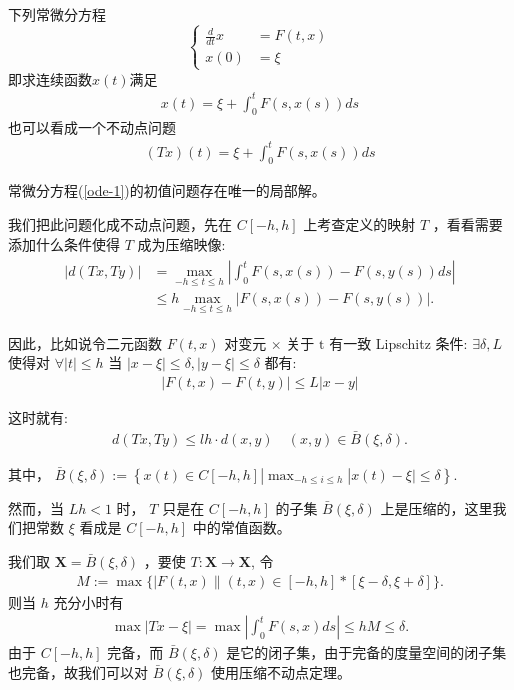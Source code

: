 下列常微分方程
\begin{equation}
    \left\lbrace\begin{array}{ll}
    \frac{d}{dt}x &= F(t, x)  \\
    x(0) &= \xi 
    \end{array}\right.\label{ode-1}
\end{equation}
即求连续函数$x(t)$满足
\begin{align*}
    x(t) = \xi + \int_{0}^t F(s, x(s)) ds
\end{align*}
也可以看成一个不动点问题
\begin{align*}
    (Tx)(t) = \xi + \int_0^t F(s, x(s))ds
\end{align*}
\begin{example}
    常微分方程(\ref{ode-1})的初值问题存在唯一的局部解。
    
    我们把此问题化成不动点问题，先在 $C[-h, h]$ 上考查定义的映射 $T$ ，看看需要添加什么条件使得 $T$ 成为压缩映像:
    \begin{align*}
        \begin{aligned}
            |d(T x, T y)| & =\max _{-h \leq t \leq h}\left|\int_0^t F(s, x(s))-F(s, y(s)) d s\right| \\
            & \leq h \max _{-h \leq t \leq h}|F(s, x(s))-F(s, y(s))| .
        \end{aligned}
    \end{align*}

    因此，比如说令二元函数 $F(t, x)$ 对变元 $\times$ 关于 $\mathrm{t}$ 有一致 Lipschitz 条件: $\exists \delta, L$ 使得对 $\forall|t| \leq h$ 当 $|x-\xi| \leq \delta,|y-\xi| \leq \delta$ 都有:
    \begin{align}
        |F(t, x)-F(t, y)| \leq L|x-y|\label{lipschitz}
    \end{align}

    这时就有:
    \begin{align*}
        d(T x, T y) \leq l h \cdot d(x, y) \quad(x, y) \in \bar{B}(\xi, \delta) .
    \end{align*}

    其中， $\bar{B}(\xi, \delta):=\left\{x(t) \in C[-h, h]\left|\max _{-h \leq i \leq h}\right| x(t)-\xi \mid \leq \delta\right\}$.

    然而，当 $L h<1$ 时， $T$ 只是在 $C[-h, h]$ 的子集 $\bar{B}(\xi, \delta)$ 上是压缩的，这里我们把常数 $\xi$ 看成是 $C[-h, h]$ 中的常值函数。

    我们取 $\mathbf{X}=\bar{B}(\xi, \delta)$ ，要使 $T: \mathbf{X} \rightarrow \mathbf{X}$, 令
    \begin{align*}
        M:=\max \{\mid F(t, x) \|(t, x) \in[-h, h] *[\xi-\delta, \xi+\delta]\} .
    \end{align*}
    则当 $h$ 充分小时有
    \begin{align*}
        \max |T x-\xi|=\max \left|\int_0^t F(s, x) d s\right| \leq h M \leq \delta .
    \end{align*}
    由于 $C[-h, h]$ 完备，而 $\bar{B}(\xi, \delta)$ 是它的闭子集，由于完备的度量空间的闭子集也完备，故我们可以对 $\bar{B}(\xi, \delta)$ 使用压缩不动点定理。
\end{example}

